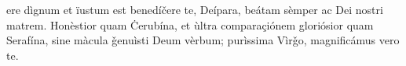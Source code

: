 ere dìgnum et ïustum est benedíčere te, Deípara, beátam sèmper ac Dei nostri matrem. Honèstior quam Ċerubína, et ùltra comparaçiónem gloriósior quam Serafína, sine màcula ǧenuìsti Deum vèrbum; purìssima Vìrǧo, magnificámus vero te.
